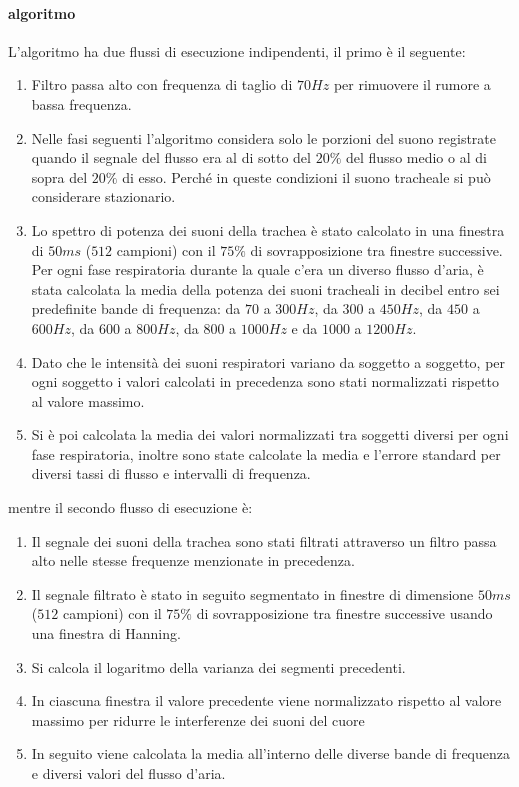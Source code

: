 \begin{frame}
    \paragraph{algoritmo}
      L'algoritmo ha due flussi di esecuzione indipendenti, il primo \`e il seguente:
      \begin{enumerate}
	\item 
	  Filtro passa alto con frequenza di taglio di $70Hz$ per rimuovere il rumore a bassa frequenza.
	\item
	  Nelle fasi seguenti l'algoritmo considera solo le porzioni del suono registrate quando il segnale del flusso era al di sotto del $20\%$ del flusso medio o al di sopra del $20\%$ di esso.
	  Perch\'e in queste condizioni il suono tracheale si pu\`o considerare stazionario.
	\item
	  Lo spettro di potenza dei suoni della trachea \`e stato calcolato in una finestra di $50ms$ ($512$ campioni) con il $75\%$ di sovrapposizione tra finestre successive. 
	  Per ogni fase respiratoria durante la quale c'era un diverso flusso d'aria, \`e stata calcolata la media della potenza dei suoni tracheali in decibel  entro sei predefinite bande di frequenza: da $70$ a $300Hz$, da $300$ a $450Hz$, da $450$ a $600Hz$, da $600$ a $800Hz$, da $800$ a $1000Hz$ e da $1000$ a $1200Hz$. 
	\item
	  Dato che le intensit\`a dei suoni respiratori variano da soggetto a soggetto, per ogni soggetto i valori calcolati in precedenza sono stati normalizzati rispetto al valore massimo.
	\item
	  Si \`e poi calcolata la media dei valori normalizzati tra soggetti diversi per ogni fase respiratoria, inoltre sono state calcolate la media e l'errore standard per diversi tassi di flusso e intervalli di frequenza.
      \end{enumerate} 
      mentre il secondo flusso di esecuzione \`e:
      \begin{enumerate}
	\item
	  Il segnale dei suoni della trachea sono stati filtrati attraverso un filtro passa alto nelle stesse frequenze menzionate in precedenza. 
	\item
	  Il segnale filtrato \`e stato in seguito segmentato in finestre di dimensione $50ms$ ($512$ campioni) con il $75\%$ di sovrapposizione tra finestre successive usando una finestra di Hanning. 
	\item
	  Si calcola il logaritmo della varianza dei segmenti precedenti.
	\item
	  In ciascuna finestra il valore precedente viene normalizzato rispetto al valore massimo per ridurre le interferenze dei suoni del cuore
	\item	
	  In seguito viene calcolata la media all'interno delle diverse bande di frequenza e diversi valori del flusso d'aria.
      \end{enumerate}
    

\end{frame}
